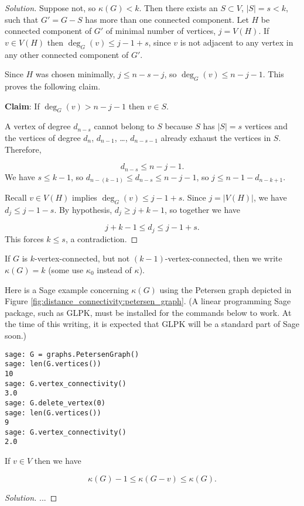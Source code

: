 \begin{proof}[Solution]
Suppose not, so $\kappa(G)<k$. Then there exists an
$S\subset V$, $|S|=s<k$, such that $G'=G-S$ has more
than one connected component. Let $H$ be connected
component of $G'$ of minimal number of
vertices, $j=V(H)$. If $v\in V(H)$ then
$\deg_G(v)\leq j-1+s$, since $v$ is not adjacent to any
vertex in any other connected component of $G'$.

Since $H$ was chosen minimally, $j\leq n-s-j$, so
$\deg_G(v)\leq n-j-1$. This proves the following claim.

\noindent
{\bf Claim}: If $\deg_G(v) > n-j-1$ then $v\in S$.

A vertex of degree $d_{n-s}$ cannot belong to
$S$ because $S$ has $|S|=s$ vertices and the
vertices of degree $d_n$, $d_{n-1}$, \dots,
$d_{n-s-1}$ already exhaust the vertices in $S$. Therefore,

\[
d_{n-s}\leq n-j-1.
\]
We have $s\leq k-1$, so $d_{n-(k-1)}\leq d_{n-s}\leq n-j-1$,
so $j\leq n-1-d_{n-k+1}$.

Recall $v\in V(H)$ implies $\deg_G(v)\leq j-1+s$.
Since $j=|V(H)|$, we have
$d_j\leq j-1-s$.
By hypothesis, $d_j\geq j+k-1$, so together we have

\[
j+k-1\leq d_j \leq j-1+s.
\]
This forces $k\leq s$, a contradiction.
\end{proof}


If $G$ is $k$-vertex-connected, but not
$(k-1)$-vertex-connected, then we write $\kappa(G)=k$
(some use $\kappa_0$ instead of $\kappa$).

Here is a Sage example concerning
$\kappa(G)$ using the Petersen graph
depicted in Figure \ref{fig:distance_connectivity:petersen_graph}.
(A linear programming
Sage package, such as GLPK, must be installed
for the commands below to work. At the time of this writing, it is
expected that GLPK will be a standard part of Sage soon.)
%
\begin{lstlisting}
sage: G = graphs.PetersenGraph()
sage: len(G.vertices())
10
sage: G.vertex_connectivity()
3.0
sage: G.delete_vertex(0)
sage: len(G.vertices())
9
sage: G.vertex_connectivity()
2.0
\end{lstlisting}

\begin{lemma}
{\rm
If $v\in V$ then we have

\[
\kappa(G)-1\leq \kappa(G-v)\leq \kappa(G).
\]
}
\end{lemma}

\begin{proof}[Solution]

...
\end{proof}


